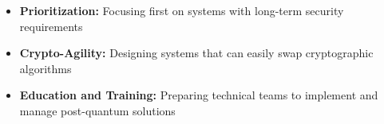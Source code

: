 \begin{itemize}
    \item \textbf{Prioritization:} Focusing first on systems with long-term security requirements
    
    \item \textbf{Crypto-Agility:} Designing systems that can easily swap cryptographic algorithms
    
    \item \textbf{Education and Training:} Preparing technical teams to implement and manage post-quantum solutions
\end{itemize}